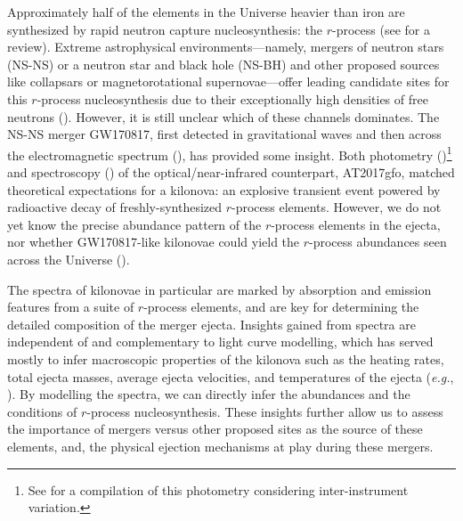 \documentclass[twocolumn,twocolappendix]{aastex63}
\def\eg{{\it e.g.}}
\begin{document}
Approximately half of the elements in the Universe heavier than iron are synthesized by rapid neutron capture nucleosynthesis: the $r$-process (see \citealt{cowan21} for a review). Extreme astrophysical environments---namely, mergers of neutron stars (NS-NS) or a neutron star and black hole (NS-BH) and other proposed sources like collapsars or magnetorotational supernovae---offer leading candidate sites for this $r$-process nucleosynthesis due to their exceptionally high densities of free neutrons (\citealt{lattimer74, symbalisty82, eichler89, freiburghaus99, goriely11, korobkin12, bauswein13}). However, it is still unclear which of these channels dominates. The NS-NS merger GW170817, first detected in gravitational waves and then across the electromagnetic spectrum (\citealt{abbottLIGO17a, abbottLIGO17b}), has provided some insight. Both photometry (\citealt{andreoni17, arcavi17, coulter17, diaz17, drout17, evans17, hu17, kasliwal17, lipunov17, tanvir17, troja17, utsumi17, valenti17})\footnote{See \cite{villar17} for a compilation of this photometry considering inter-instrument variation.} and spectroscopy (\citealt{chornock17, kasen17, pian17, shappee17, smartt17}) of the optical/near-infrared counterpart, AT2017gfo, matched theoretical expectations for a kilonova: an explosive transient event powered by radioactive decay of freshly-synthesized $r$-process elements. However, we do not yet know the precise abundance pattern of the $r$-process elements in the ejecta, nor whether GW170817-like kilonovae could yield the $r$-process abundances seen across the Universe (\citealt{ji19, cowan21}).

The spectra of kilonovae in particular are marked by absorption and emission features from a suite of $r$-process elements, and are key for determining the detailed composition of the merger ejecta. Insights gained from spectra are independent of and complementary to light curve modelling, which has served mostly to infer macroscopic properties of the kilonova such as the heating rates, total ejecta masses, average ejecta velocities, and temperatures of the ejecta (\eg, \citealt{villar17, almualla21, breschi21, ristic22}). By modelling the spectra, we can directly infer the abundances and the conditions of $r$-process nucleosynthesis. These insights further allow us to assess the importance of mergers versus other proposed sites as the source of these elements, and, the physical ejection mechanisms at play during these mergers. 
\end{document}
